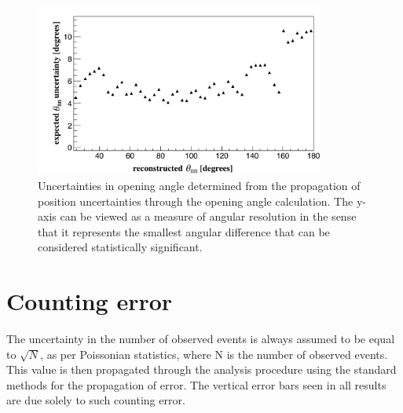 \begin{figure}[h]
    \centering
    \includegraphics[width = 0.85\textwidth]{Content/Errors/OpeningAngleUncertainty.png}
    \caption{Uncertainties in opening angle determined from the propagation of position uncertainties through the opening angle calculation.
    The y-axis can be viewed as a measure of angular resolution in the sense that it represents the smallest angular difference that can be considered statistically significant.
    }
    \label{fig:OpeningAngleRes}
\end{figure}

\section{Counting error}
The uncertainty in the number of observed events is always assumed to be equal to $\sqrt{N}$, as per Poissonian  statistics, where N is the number of observed events.
This value is then propagated through the analysis procedure using the standard methods for the propagation of error.
The vertical error bars seen in all results are due solely to such counting error.

\FloatBarrier

